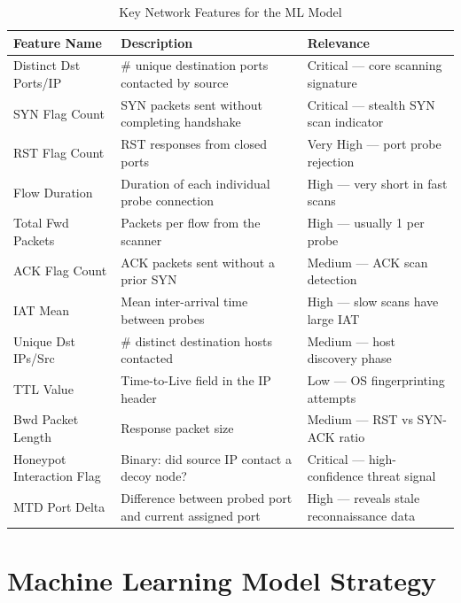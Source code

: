 \documentclass[12pt,a4paper]{report}
\begin{document}
\begin{table}[h!]
\centering
\caption{Key Network Features for the ML Model}
\begin{tabular}{@{}L{4cm} L{5.5cm} L{4.5cm}@{}}
  \toprule
  \textbf{Feature Name} & \textbf{Description} & \textbf{Relevance} \\
  \midrule
  Distinct Dst Ports/IP
    & \# unique destination ports contacted by source
    & Critical --- core scanning signature \\
  \addlinespace
  SYN Flag Count
    & SYN packets sent without completing handshake
    & Critical --- stealth SYN scan indicator \\
  \addlinespace
  RST Flag Count
    & RST responses from closed ports
    & Very High --- port probe rejection \\
  \addlinespace
  Flow Duration
    & Duration of each individual probe connection
    & High --- very short in fast scans \\
  \addlinespace
  Total Fwd Packets
    & Packets per flow from the scanner
    & High --- usually 1 per probe \\
  \addlinespace
  ACK Flag Count
    & ACK packets sent without a prior SYN
    & Medium --- ACK scan detection \\
  \addlinespace
  IAT Mean
    & Mean inter-arrival time between probes
    & High --- slow scans have large IAT \\
  \addlinespace
  Unique Dst IPs/Src
    & \# distinct destination hosts contacted
    & Medium --- host discovery phase \\
  \addlinespace
  TTL Value
    & Time-to-Live field in the IP header
    & Low --- OS fingerprinting attempts \\
  \addlinespace
  Bwd Packet Length
    & Response packet size
    & Medium --- RST vs SYN-ACK ratio \\
  \addlinespace
  Honeypot Interaction Flag
    & Binary: did source IP contact a decoy node?
    & Critical --- high-confidence threat signal \\
  \addlinespace
  MTD Port Delta
    & Difference between probed port and current assigned port
    & High --- reveals stale reconnaissance data \\
  \bottomrule
\end{tabular}
\label{tab:features}
\end{table}

\chapter{Machine Learning Model Strategy}
\end{document}
